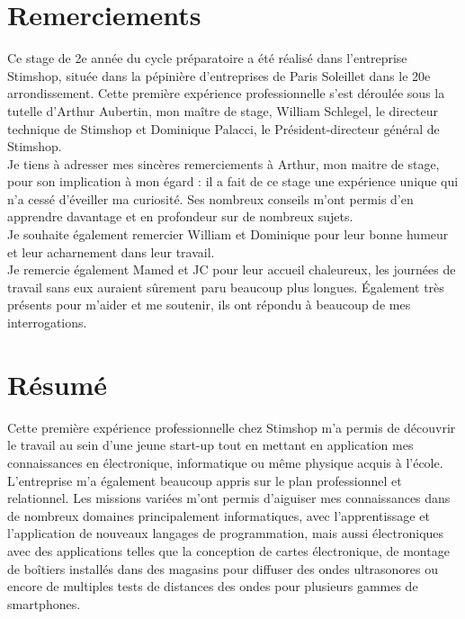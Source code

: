 \documentclass[12pt]{report}
\begin{document}


\chapter*{Remerciements}
Ce stage de 2e année du cycle préparatoire a été réalisé dans l'entreprise Stimshop, située dans la pépinière d'entreprises de Paris Soleillet dans le 20e arrondissement. Cette première expérience professionnelle s'est déroulée sous la tutelle d'Arthur Aubertin, mon maître de stage, William Schlegel, le directeur technique de Stimshop et Dominique Palacci, le Président-directeur général de Stimshop. \\

Je tiens à adresser mes sincères remerciements à Arthur, mon maitre de stage, pour son implication à mon égard : il a fait de ce stage une expérience unique qui n'a cessé d'éveiller ma curiosité. Ses nombreux conseils m'ont permis d'en apprendre davantage et en profondeur sur de nombreux sujets. \\

Je souhaite également remercier William et Dominique pour leur bonne humeur et leur acharnement dans leur travail. \\

Je remercie également Mamed et JC pour leur accueil chaleureux, les journées de travail sans eux auraient sûrement paru beaucoup plus longues. Également très présents pour m'aider et me soutenir, ils ont répondu à beaucoup de mes interrogations. 
\newpage

\chapter*{Résumé}

Cette première expérience professionnelle chez Stimshop m'a permis de découvrir le travail au sein d'une jeune start-up tout en mettant en application mes connaissances en électronique, informatique ou même physique acquis à l'école. L'entreprise m'a également beaucoup appris sur le plan professionnel et relationnel. Les missions variées m'ont permis d'aiguiser mes connaissances dans de nombreux domaines principalement informatiques, avec l'apprentissage et l'application de nouveaux langages de programmation, mais aussi électroniques avec des applications telles que la conception de cartes électronique, de montage de boîtiers installés dans des magasins pour diffuser des ondes ultrasonores ou encore de multiples tests de distances des ondes pour plusieurs gammes de smartphones.
\newpage
\end{document}
